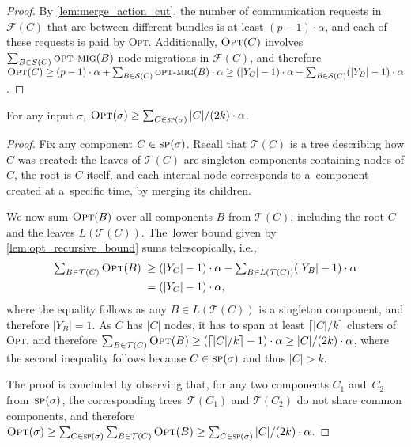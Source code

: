 \documentclass{siamart190516}
\newcommand{\OPT}{\textsc{Opt}\xspace}
\newcommand{\T}{\mathcal{T}}
\newcommand{\optmig}{\textsc{opt-mig}}
\newcommand{\spl}{\textsc{sp}}
\newcommand{\set}{\mathcal{S}}
\newcommand{\F}{\mathcal{F}}
\begin{document}
\begin{proof}
By \cref{lem:merge_action_cut}, the number of communication requests in
$\F(C)$ that are between different bundles is at least $(p-1) \cdot \alpha$,
and each of these requests is paid by \OPT.
Additionally, $\OPT(C)$ involves $\sum_{B \in \set(C)}
\optmig(B)$ node migrations in $\F(C)$, and therefore $\OPT(C) \geq (p-1) \cdot
\alpha + \sum_{B \in \set(C)} \optmig(B) \cdot \alpha
\geq (|Y_C|-1) \cdot \alpha - \sum_{B \in \set(C)} (|Y_B|-1) \cdot \alpha$.
\end{proof}



\begin{lemma}
\label{lem:opt_lower_bound}
For any input $\sigma$, $\OPT(\sigma) \geq \sum_{C \in \spl(\sigma)}
|C| / (2k) \cdot \alpha$.
\end{lemma}

\begin{proof}
Fix any component $C \in \spl(\sigma)$. Recall that $\T(C)$ is a tree
describing how $C$ was created: the leaves of $\T(C)$ are singleton
components containing nodes of $C$, the root is $C$ itself, and each internal
node corresponds to a~component created at a~specific time, by merging its
children.

We now sum $\OPT(B)$ over all components $B$ from $\T(C)$, including 
the root $C$ and the leaves $L(\T(C))$. The~lower bound given 
by \cref{lem:opt_recursive_bound} sums telescopically, i.e.,
\begin{align*}
	\textstyle \sum_{B \in \T(C)} \OPT(B) \;
		\geq &\; \textstyle (|Y_C|-1) \cdot \alpha - \sum_{B \in L(\T(C))} (|Y_B|-1) \cdot \alpha \\
		= &\; \textstyle (|Y_C|-1) \cdot \alpha,
\end{align*}
where the equality follows as any $B \in L(\T(C))$ is a singleton component,
and therefore $|Y_B| = 1$. As $C$ has $|C|$ nodes, it has to span at least
$\lceil |C|/k \rceil$ clusters of \OPT, and therefore $\sum_{B \in \T(C)}
\OPT(B) \geq (\lceil |C|/k \rceil -1) \cdot \alpha \geq |C| / (2 k) \cdot
\alpha$, where the second inequality follows because $C \in \spl(\sigma)$ and
thus $|C| > k$.

The proof is concluded by observing that, for any two components $C_1$
and~$C_2$ from~$\spl(\sigma)$, the corresponding trees~$\T(C_1)$ and $\T(C_2)$ do not share common
components, and therefore $\OPT(\sigma) \geq \sum_{C \in \spl(\sigma)} \sum_{B
\in \T(C)} \OPT(B) \geq \sum_{C \in \spl(\sigma)} |C| / (2k) \cdot \alpha$.
\end{proof}
\end{document}
